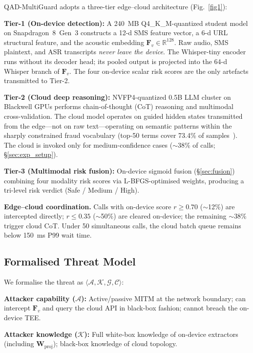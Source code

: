 \documentclass[lettersize,journal]{IEEEtran}
\begin{document}
QAD-MultiGuard adopts a three-tier edge--cloud architecture
(Fig.~\ref{fig1}):

\textbf{Tier-1 (On-device detection):} A 240~MB Q4\_K\_M-quantized
student model on Snapdragon~8~Gen~3 constructs a 12-d SMS feature
vector, a 6-d URL structural feature, and the acoustic embedding
$\bm{F}_v \in \mathbb{R}^{128}$.  Raw audio, SMS plaintext, and ASR
transcripts \emph{never leave the device}.  The Whisper-tiny encoder
runs without its decoder head; its pooled output is projected into
the 64-d Whisper branch of $\bm{F}_v$.  The four on-device scalar risk
scores are the only artefacts transmitted to Tier-2.

\textbf{Tier-2 (Cloud deep reasoning):} NVFP4-quantized 0.5B LLM
cluster on Blackwell GPUs performs chain-of-thought (CoT) reasoning
and multimodal cross-validation.  The cloud model operates on guided
hidden states transmitted from the edge---not on raw text---operating
on semantic patterns within the sharply constrained fraud vocabulary
(top-50 terms cover 73.4\% of samples~\cite{1}).  The cloud is
invoked only for medium-confidence cases ($\sim$38\% of calls; \S\ref{sec:exp_setup}).

\textbf{Tier-3 (Multimodal risk fusion):} On-device sigmoid fusion
(\S\ref{sec:fusion}) combining four modality risk scores via
L-BFGS-optimised weights, producing a tri-level risk verdict (Safe /
Medium / High).

\textbf{Edge--cloud coordination.} Calls with on-device score $r
\ge 0.70$ ($\sim$12\%) are intercepted directly; $r \le 0.35$
($\sim$50\%) are cleared on-device; the remaining $\sim$38\% trigger
cloud CoT.  Under 50 simultaneous calls, the cloud batch queue
remains below 150~ms P99 wait time.

\subsection{Formalised Threat Model}

We formalise the threat as $\langle\mathcal{A},\mathcal{K},
\mathcal{G},\mathcal{C}\rangle$:

\textbf{Attacker capability ($\mathcal{A}$):} Active/passive MITM at
the network boundary; can intercept $\bm{F}_v$ and query the cloud
API in black-box fashion; cannot breach the on-device TEE.

\textbf{Attacker knowledge ($\mathcal{K}$):} Full white-box knowledge
of on-device extractors (including $\bm{W}_{\mathrm{proj}}$); black-box
knowledge of cloud topology.
\end{document}
